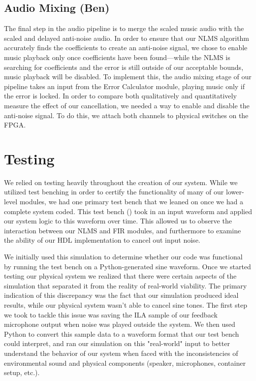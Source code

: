 \documentclass{fpgairpods}
\begin{document}
\subsection{Audio Mixing (Ben)}
The final step in the audio pipeline is to merge the scaled music audio with the scaled and delayed anti-noise audio. In order to ensure that our NLMS algorithm accurately finds the coefficients to create an anti-noise signal, we chose to enable music playback only once coefficients have been found---while the NLMS is searching for coefficients and the error is still outside of our acceptable bounds, music playback will be disabled. To implement this, the audio mixing stage of our pipeline takes an input from the Error Calculator module, playing music only if the error is locked. In order to compare both qualitatively and quantitatively measure the effect of our cancellation, we needed a way to enable and disable the anti-noise signal. To do this, we attach both channels to physical switches on the FPGA.

\section{Testing}
We relied on testing heavily throughout the creation of our system. While we utilized test benching in order to certify the functionality of many of our lower-level modules, we had one primary test bench that we leaned on once we had a complete system coded. This test bench () took in an input waveform and applied our system logic to this waveform over time. This allowed us to observe the interaction between our NLMS and FIR modules, and furthermore to examine the ability of our HDL implementation to cancel out input noise.

We initially used this simulation to determine whether our code was functional by running the test bench on a Python-generated sine waveform. Once we started testing our physical system we realized that there were certain aspects of the simulation that separated it from the reality of real-world viability. The primary indication of this discrepancy was the fact that our simulation produced ideal results, while our physical system wasn't able to cancel sine tones. The first step we took to tackle this issue was saving the ILA sample of our feedback microphone output when noise was played outside the system. We then used Python to convert this sample data to a waveform format that our test bench could interpret, and ran our simulation on this "real-world" input to better understand the behavior of our system when faced with the inconsistencies of environmental sound and physical components (speaker, microphones, container setup, etc.).
\end{document}
